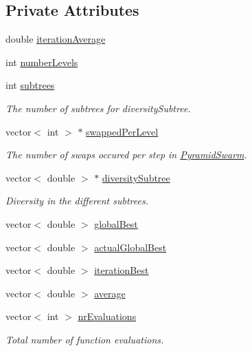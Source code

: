 \subsection*{Private Attributes}
\begin{CompactItemize}
\item 
double \hyperlink{classPsoStatistics_12fc174bcbad0248b48a356cf3304b29}{iterationAverage}
\item 
int \hyperlink{classPsoStatistics_9f08ad8f8051708b7eb1783cbe17219e}{numberLevels}
\item 
int \hyperlink{classPsoStatistics_2116d71d39a38afe58c096278ab054b3}{subtrees}
\begin{CompactList}\small\item\em The number of subtrees for diversitySubtree. \item\end{CompactList}\item 
vector$<$ int $>$ $\ast$ \hyperlink{classPsoStatistics_77332ba8e781b613b82602e0ddbbe8fe}{swappedPerLevel}
\begin{CompactList}\small\item\em The number of swaps occured per step in \hyperlink{classPyramidSwarm}{PyramidSwarm}. \item\end{CompactList}\item 
vector$<$ double $>$ $\ast$ \hyperlink{classPsoStatistics_08cbf891f34ca4f5b71545588d30cb9d}{diversitySubtree}
\begin{CompactList}\small\item\em Diversity in the different subtrees. \item\end{CompactList}\item 
vector$<$ double $>$ \hyperlink{classPsoStatistics_d722cb30c693021e23678f7ea04e59cb}{globalBest}
\item 
vector$<$ double $>$ \hyperlink{classPsoStatistics_eed25ec71564e096eaacad2fbf0dc5cc}{actualGlobalBest}
\item 
vector$<$ double $>$ \hyperlink{classPsoStatistics_aaf855c6f7fbf4fc3e2f297d3b047541}{iterationBest}
\item 
vector$<$ double $>$ \hyperlink{classPsoStatistics_916e5a0000c614dc4e29a59f83f0fba8}{average}
\item 
vector$<$ int $>$ \hyperlink{classPsoStatistics_de2e6696a7c404891fe80ff4c2bfcaa3}{nrEvaluations}
\begin{CompactList}\small\item\em Total number of function evaluations. \item\end{CompactList}\item 

\end{CompactItemize}
